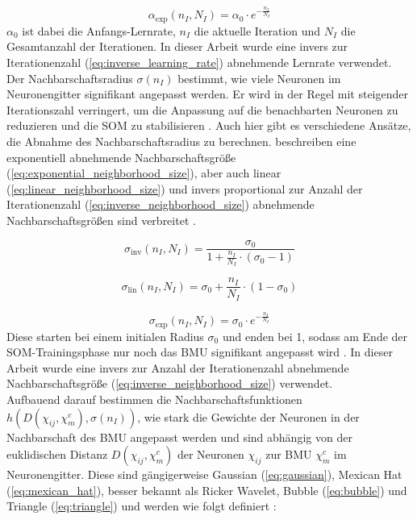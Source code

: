 \begin{equation}
    \alpha_{\text{exp}}(n_I, N_I) = \alpha_0 \cdot e^{-\frac{n_I}{N_I}}
    \label{eq:exponential_learning_rate}
\end{equation}
$\alpha_0$ ist dabei die Anfangs-Lernrate, $n_I$ die aktuelle Iteration und $N_I$ die Gesamtanzahl der Iterationen. In dieser Arbeit wurde eine invers zur Iterationenzahl (\ref{eq:inverse_learning_rate}) abnehmende Lernrate verwendet.\\
Der Nachbarschaftsradius $\sigma(n_I)$ bestimmt, wie viele Neuronen im Neuronengitter signifikant angepasst werden. Er wird in der Regel mit steigender Iterationszahl verringert, um die Anpassung auf die benachbarten Neuronen zu reduzieren und die SOM zu stabilisieren \parencite{kohonen_self-organizing_2001}. Auch hier gibt es verschiedene Ansätze, die Abnahme des Nachbarschaftsradius zu berechnen. \textcite{natita_appropriate_2016} beschreiben eine exponentiell abnehmende Nachbarschaftsgröße (\ref{eq:exponential_neighborhood_size}), aber auch linear (\ref{eq:linear_neighborhood_size}) und invers proportional zur Anzahl der Iterationenzahl (\ref{eq:inverse_neighborhood_size}) abnehmende Nachbarschaftsgrößen sind verbreitet \parencite{vettigli_minisom_2021}.

\begin{equation}
    \sigma_{\text{inv}}(n_I, N_I) = \frac{\sigma_0}{1 + \frac{n_I}{N_I} \cdot (\sigma_0 - 1)}
    \label{eq:inverse_neighborhood_size}
\end{equation}

\begin{equation}
    \sigma_{\text{lin}}(n_I, N_I) = \sigma_0 + \frac{n_I}{N_I} \cdot (1 - \sigma_0)
    \label{eq:linear_neighborhood_size}
\end{equation}

\begin{equation}
    \sigma_{\text{exp}}(n_I, N_I) = \sigma_0 \cdot e^{-\frac{n_I}{N_I}}
    \label{eq:exponential_neighborhood_size}
\end{equation}
Diese starten bei einem initialen Radius $\sigma_0$ und enden bei 1, sodass am Ende der SOM-Trainingsphase nur noch das BMU signifikant angepasst wird \parencite{kohonen_self-organizing_2001}. In dieser Arbeit wurde eine invers zur Anzahl der Iterationenzahl abnehmende Nachbarschaftsgröße (\ref{eq:inverse_neighborhood_size}) verwendet.\\
Aufbauend darauf bestimmen die Nachbarschaftsfunktionen $h(D(\chi_{ij}, \chi_{m}^c), \sigma(n_I))$, wie stark die Gewichte der Neuronen in der Nachbarschaft des BMU angepasst werden und sind abhängig von der euklidischen Distanz $D(\chi_{ij}, \chi_{m}^c)$ der Neuronen $\chi_{ij}$ zur BMU $\chi_{m}^c$ im Neuronengitter. Diese sind gängigerweise Gaussian (\ref{eq:gaussian}), Mexican Hat (\ref{eq:mexican_hat}), besser bekannt als Ricker Wavelet, Bubble (\ref{eq:bubble}) und Triangle (\ref{eq:triangle}) und werden wie folgt definiert \parencite{vettigli_minisom_2021}:

